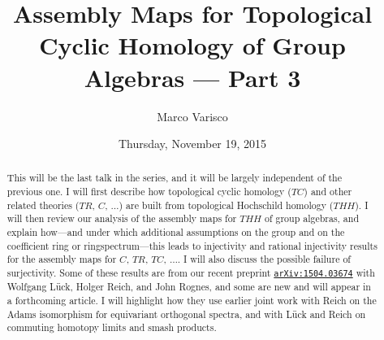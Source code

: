 \documentclass{UAmathtalk}
\author{Marco Varisco}
\title{Assembly Maps for Topological Cyclic Homology of Group Algebras --- Part 3}
\date{Thursday, November 19, 2015}
\begin{document}
\maketitle

\begin{abstract}
This will be the last talk in the series, and it will be largely independent of the previous one.
I will first describe how topological cyclic homology ($TC$) and other related theories ($TR$, $C$, $\ldots$) are built from topological Hochschild homology ($THH$).
I will then review our analysis of the assembly maps for $THH$ of group algebras, and explain how---and under which additional assumptions on the group and on the coefficient ring or ringspectrum---this leads to injectivity and rational injectivity results for the assembly maps for $C$, $TR$, $TC$, $\ldots.$
I will also discuss the possible failure of \mbox{surjectivity.}
Some of these results are from our recent preprint  \href{http://www.arxiv.org/abs/1504.03674/}{\texttt{arXiv:1504.03674}} with Wolfgang Lück, Holger Reich, and John Rognes, and some are new and will appear in a forthcoming article.
I will highlight how they use earlier joint work with Reich on the Adams isomorphism for equivariant orthogonal spectra, and with Lück and Reich on commuting homotopy limits and smash products.
\end{abstract}
\end{document}
